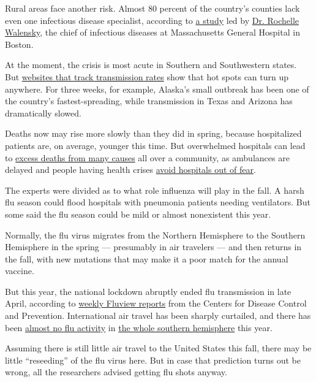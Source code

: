 Rural areas face another risk. Almost 80 percent of the country's
counties lack even one infectious disease specialist, according to
\href{https://www.acpjournals.org/doi/10.7326/M20-2684}{a study} led by
\href{https://www.massgeneral.org/doctors/17245/rochelle-walensky}{Dr.
Rochelle Walensky}, the chief of infectious diseases at Massachusetts
General Hospital in Boston.

At the moment, the crisis is most acute in Southern and Southwestern
states. But \href{https://rt.live/}{websites that track transmission
rates} show that hot spots can turn up anywhere. For three weeks, for
example, Alaska's small outbreak has been one of the country's
fastest-spreading, while transmission in Texas and Arizona has
dramatically slowed.

Deaths now may rise more slowly than they did in spring, because
hospitalized patients are, on average, younger this time. But
overwhelmed hospitals can lead to
\href{https://www.nytimes.com/interactive/2020/06/01/us/coronavirus-deaths-new-york-new-jersey.html}{excess
deaths from many causes} all over a community, as ambulances are delayed
and people having health crises
\href{https://www.nytimes.com/2020/06/09/opinion/coronavirus-hospitals-deaths.html}{avoid
hospitals out of fear}.

The experts were divided as to what role influenza will play in the
fall. A harsh flu season could flood hospitals with pneumonia patients
needing ventilators. But some said the flu season could be mild or
almost nonexistent this year.

Normally, the flu virus migrates from the Northern Hemisphere to the
Southern Hemisphere in the spring --- presumably in air travelers ---
and then returns in the fall, with new mutations that may make it a poor
match for the annual vaccine.

But this year, the national lockdown abruptly ended flu transmission in
late April, according to
\href{https://www.cdc.gov/flu/weekly/index.htm}{weekly Fluview reports}
from the Centers for Disease Control and Prevention. International air
travel has been sharply curtailed, and there has been
\href{https://www.abc.net.au/news/2020-06-13/flu-cases-drop-amid-coronavirus-restrictions-statistics-show/12332204}{almost
no flu activity} in
\href{https://www.wsj.com/articles/covid-19-measures-have-all-but-wiped-out-the-flu-in-the-southern-hemisphere-11595440682}{the
whole southern hemisphere} this year.

Assuming there is still little air travel to the United States this
fall, there may be little ``reseeding'' of the flu virus here. But in
case that prediction turns out be wrong, all the researchers advised
getting flu shots anyway.

